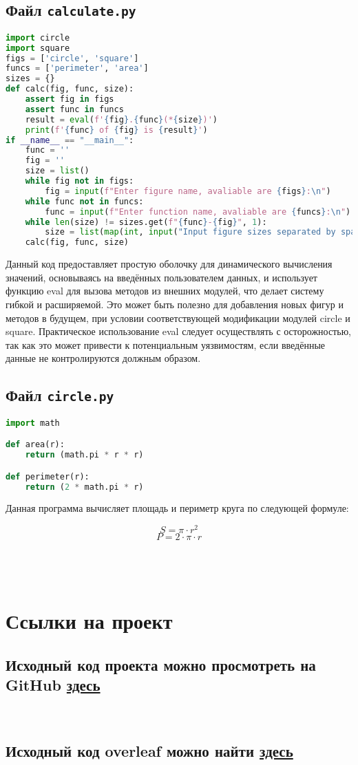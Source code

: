 \documentclass[a4paper,12pt]{article}
\begin{document}
\subsection{Файл \texttt{calculate.py}}
\begin{lstlisting}[language=Python]
import circle
import square
figs = ['circle', 'square']
funcs = ['perimeter', 'area']
sizes = {}
def calc(fig, func, size):
	assert fig in figs
	assert func in funcs
	result = eval(f'{fig}.{func}(*{size})')
	print(f'{func} of {fig} is {result}')
if __name__ == "__main__":
	func = ''
	fig = ''
	size = list()
	while fig not in figs:
		fig = input(f"Enter figure name, avaliable are {figs}:\n")
	while func not in funcs:
		func = input(f"Enter function name, avaliable are {funcs}:\n")
	while len(size) != sizes.get(f"{func}-{fig}", 1):
		size = list(map(int, input("Input figure sizes separated by space, 1 for circle and square\n").split(' ')))
	calc(fig, func, size)
\end{lstlisting}
Данный код предоставляет простую оболочку для динамического вычисления значений, основываясь на введённых пользователем данных, и использует функцию eval для вызова методов из внешних модулей, что делает систему гибкой и расширяемой. Это может быть полезно для добавления новых фигур и методов в будущем, при условии соответствующей модификации модулей circle и square. Практическое использование eval следует осуществлять с осторожностью, так как это может привести к потенциальным уязвимостям, если введённые данные не контролируются должным образом.
\newpage
\subsection{Файл \texttt{circle.py}}
\begin{lstlisting}[language=Python]
import math

def area(r):
    return (math.pi * r * r)

def perimeter(r):
    return (2 * math.pi * r)
\end{lstlisting}

Данная программа вычисляет площадь и периметр круга по следующей формуле:

\[
S = \pi \cdot r^2
\]
\[
P = 2 \cdot \pi \cdot r
\]
\\
\\
\\
\section{Ссылки на проект}
\subsection{Исходный код проекта можно просмотреть на GitHub \href{https://github.com/call-CloudY9/geometric_lib.git}{здесь}}
\\
\subsection{Исходный код overleaf можно найти 
\href{https://github.com/call-CloudY9/Latex.git}{здесь}}
\end{document}
